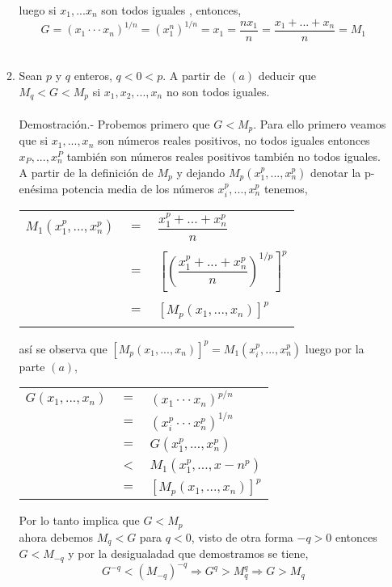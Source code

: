 \begin{enumerate}
\begin{enumerate}[\bfseries (a)]
luego si $x_1,...x_n$ son todos iguales , entonces, $$G=(x_1\cdot \cdot \cdot x_n)^{1/n} = (x_1^n)^{1/n}=x_1 =  \dfrac{n x_1}{n} = \dfrac{x_1 + ... + x_n}{n} = M_1$$\\
\item Sean $p$ y $q$ enteros, $q<0<p$. A partir de $(a)$ deducir que $M_q< G < M_p$ si $x_1,x_2,...,x_n$ no son todos iguales.\\\\
Demostración.- \; Probemos primero que $G < M_p$. Para ello primero veamos que si $x_1,...,x_n$ son números reales positivos, no todos iguales entonces $x_P,...,x_n^P$ también son números reales positivos también no todos iguales. A partir de la definición de $M_p$ y dejando $M_p(x_1^p,...,x_n^p)$ denotar la p-enésima potencia media de los números $x_i^p,...,x_n^p$ tenemos,
\begin{center}
\begin{tabular}{rcl}
$M_1(x_1^p,...,x_n^p)$&$=$&$\dfrac{x_1^p + ... + x_n^p}{n}$\\\\
&$=$&$\left[ \left( \dfrac{x_1^p + ... + x_n^p}{n} \right)^{1/p} \right]^p$\\\\
&$=$&$[M_p(x_1,...,x_n)]^p$\\\\
\end{tabular}
\end{center}
así se observa que $[M_p(x_1,...,x_n)]^p = M_1(x_i^p,...,x_n^p)$ luego por la parte $(a)$,
\begin{center}
\begin{tabular}{rcl}
$G(x_1,...,x_n)$&$=$&$(x_1\cdot \cdot \cdot x_n)^{p/n}$\\
&$=$&$(x_i^p \cdot \cdot \cdot x_n^p)^{1/n}$\\
&$=$&$G(x_1^p,...,x_n^p)$\\
&$<$&$M_1(x_1^p,...,x-n^p)$\\
&$=$&$[M_p(x_1,...,x_n)]^p$\\
\end{tabular}
\end{center}
Por lo tanto implica que  $G<M_p$\\
ahora debemos  $M_q<G$ para $q<0$, visto de otra forma $-q>0$ entonces $G<M_{-q}$ y por la desigualadad que demostramos se tiene, $$G^{-q}<(M_{-q})^{-q} \Rightarrow G^q > M_q^q \Rightarrow G > M_q$$\\\\
\end{enumerate}


\end{enumerate}
